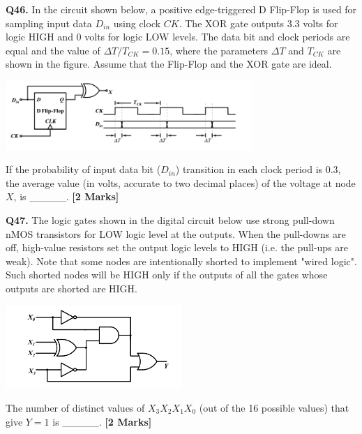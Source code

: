\documentclass[11pt]{article}
\newcommand{\questionb}[2]{
    \noindent\textbf{Q#2.} #1 \hfill \textbf{[2 Marks]}
}
\begin{document}
\vspace{0.5cm}

\questionb{In the circuit shown below, a positive edge-triggered D Flip-Flop is used for sampling input data $D_{in}$ using clock $CK$. The XOR gate outputs 3.3 volts for logic HIGH and 0 volts for logic LOW levels. The data bit and clock periods are equal and the value of $\Delta T/T_{CK} = 0.15$, where the parameters $\Delta T$ and $T_{CK}$ are shown in the figure. Assume that the Flip-Flop and the XOR gate are ideal.

\begin{center}
\includegraphics[width=0.7\textwidth]{figures/46.png}
\end{center}

If the probability of input data bit ($D_{in}$) transition in each clock period is 0.3, the average value (in volts, accurate to two decimal places) of the voltage at node $X$, is \_\_\_\_\_.}{46}

\vspace{0.5cm}

\questionb{The logic gates shown in the digital circuit below use strong pull-down nMOS transistors for LOW logic level at the outputs. When the pull-downs are off, high-value resistors set the output logic levels to HIGH (i.e. the pull-ups are weak). Note that some nodes are intentionally shorted to implement "wired logic". Such shorted nodes will be HIGH only if the outputs of all the gates whose outputs are shorted are HIGH.

\begin{center}
\includegraphics[width=0.5\textwidth]{figures/47.png}
\end{center}

The number of distinct values of $X_3 X_2 X_1 X_0$ (out of the 16 possible values) that give $Y = 1$ is \_\_\_\_\_.}{47}

\vspace{0.5cm}
\end{document}
